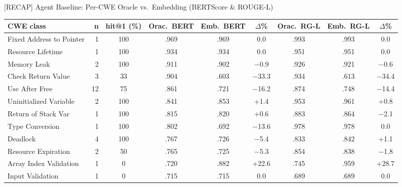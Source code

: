 \documentclass[aspectratio=169,10pt]{beamer}
\newcommand{\chit}[1]{\cellcolor{hit!30} #1}
\newcommand{\cmiss}[1]{\cellcolor{miss!25} #1}
\newcommand{\cwarn}[1]{\cellcolor{warn!30} #1}
\begin{document}
\begin{frame}{[RECAP] Agent Baseline: Per-CWE Oracle vs.\ Embedding (BERTScore \& ROUGE-L)}

  \centering
  \vspace{-0.2em}
  {\tiny
  \renewcommand{\arraystretch}{1.15}
  \setlength{\tabcolsep}{2.5pt}
  \begin{tabular}{l r c c c c c c c}
    \toprule
    \textbf{CWE class}
      & \textbf{n}
      & \textbf{hit@1 (\%)}
      & \textbf{Orac.\ BERT}
      & \textbf{Emb.\ BERT}
      & \textbf{$\Delta$\%}
      & \textbf{Orac.\ RG-L}
      & \textbf{Emb.\ RG-L}
      & \textbf{$\Delta$\%} \\
    \midrule
    \rowcolor{hit!8}
    Fixed Address to Pointer          & 1  & \chit{100}  & .969 & .969 & 0.0            & .993 & .993 & 0.0 \\
    Resource Lifetime                 & 1  & \chit{100}  & .934 & .934 & 0.0            & .951 & .951 & 0.0 \\
    Memory Leak                       & 2  & \chit{100}  & .911 & .902 & $-$0.9         & .926 & .921 & $-$0.6 \\
    Check Return Value                & 3  & \cwarn{33}  & .904 & .603 & \cmiss{$-$33.3}& .934 & .613 & \cmiss{$-$34.4} \\
    Use After Free                    & 12 & \cwarn{75}  & .861 & .721 & \cmiss{$-$16.2}& .874 & .748 & \cmiss{$-$14.4} \\
    Uninitialized Variable            & 2  & \chit{100}  & .841 & .853 & \chit{+1.4}   & .953 & .961 & \chit{+0.8} \\
    Return of Stack Var               & 1  & \chit{100}  & .815 & .820 & +0.6           & .883 & .864 & $-$2.1 \\
    Type Conversion                   & 1  & \chit{100}  & .802 & .692 & \cmiss{$-$13.6}& .978 & .978 & 0.0 \\
    \midrule
    Deadlock                          & 4  & \chit{100}  & .767 & .726 & $-$5.4         & .833 & .842 & +1.1 \\
    Resource Expiration               & 2  & \cwarn{50}  & .765 & .725 & $-$5.3         & .854 & .838 & $-$1.8 \\
    Array Index Validation            & 1  & \cmiss{0}   & .720 & .882 & \chit{+22.6}  & .745 & .959 & \chit{+28.7} \\
    Input Validation                  & 1  & \cmiss{0}   & .715 & .715 & 0.0            & .689 & .689 & 0.0 \\

\end{tabular}}
\end{frame}
\end{document}
